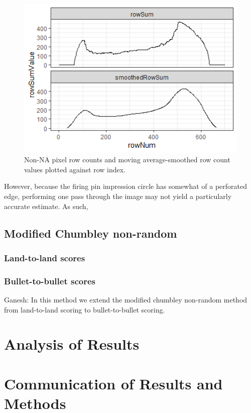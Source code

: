 \documentclass[]{book}
\begin{document}
\begin{figure}

{\centering \includegraphics[width=0.5\linewidth]{images/cartridge_cases/nonNA_rowSums} 

}

\caption{Non-NA pixel row counts and moving average-smoothed row count values plotted against row index.}\label{fig:unnamed-chunk-23}
\end{figure}

However, because the firing pin impression circle has somewhat of a perforated edge, performing one pass through the image may not yield a particularly accurate estimate. As such,

\hypertarget{modified-chumbley-non-random}{%
\subsection{Modified Chumbley non-random}\label{modified-chumbley-non-random}}

\hypertarget{land-to-land-scores}{%
\subsubsection{Land-to-land scores}\label{land-to-land-scores}}

\hypertarget{bullet-to-bullet-scores}{%
\subsubsection{Bullet-to-bullet scores}\label{bullet-to-bullet-scores}}

Ganesh: In this method we extend the modified chumbley non-random method from land-to-land scoring to bullet-to-bullet scoring.

\hypertarget{analysis-of-results}{%
\section{Analysis of Results}\label{analysis-of-results}}

\hypertarget{communication-of-results-and-methods}{%
\section{Communication of Results and Methods}\label{communication-of-results-and-methods}}
\end{document}
